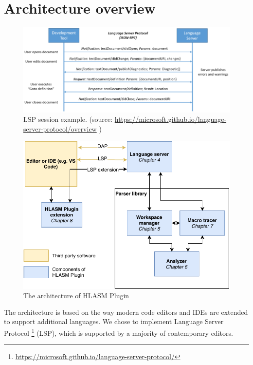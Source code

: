 \chapter{Architecture overview}
\label{arch}

\begin{figure}
	\centering
	\includegraphics[width=\textwidth]{img/language-server-sequence}
	\caption[LSP session example.]{LSP session example. (source: \url{https://microsoft.github.io/language-server-protocol/overview} )}
	\label{fig04:LSP}
\end{figure}

\begin{figure}
	\centering
	\includegraphics[width=\textwidth]{img/hlasm_architecture}
	\caption{The architecture of HLASM Plugin}
	
	\label{fig04:arch}
\end{figure}

The architecture is based on the way modern code editors and IDEs are extended to support additional languages. We chose to implement Language Server Protocol \footnote{\url{https://microsoft.github.io/language-server-protocol/}} (LSP), which is supported by a majority of contemporary editors.

